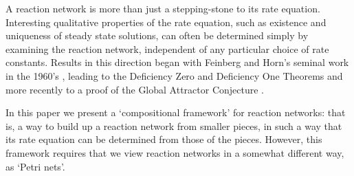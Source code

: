 \documentclass{compositionalityarticle}
\theoremstyle{compositionality}
\theoremstyle{remark}
\begin{document}
A reaction network is more than just a stepping-stone to its rate equation.  Interesting qualitative properties of the rate equation, such as existence and uniqueness of steady state solutions, can often be determined simply by examining the reaction network, independent of any particular choice of rate constants.  Results in this direction began with  Feinberg and Horn's seminal work in the 1960's \cite{Feinberg,FeinbergHorn}, leading to the Deficiency Zero and Deficiency One Theorems \cite{Feinberg1995a,Feinberg1995b} and more recently to a proof of the Global Attractor Conjecture \cite{Craciun}.     

In this paper we present a `compositional framework' for reaction networks: that is, a way to build up a reaction network from smaller pieces, in such a way that its rate equation can be determined from those of the pieces.   However, this framework requires that we view reaction networks in a somewhat different way, as `Petri nets'.
\end{document}
